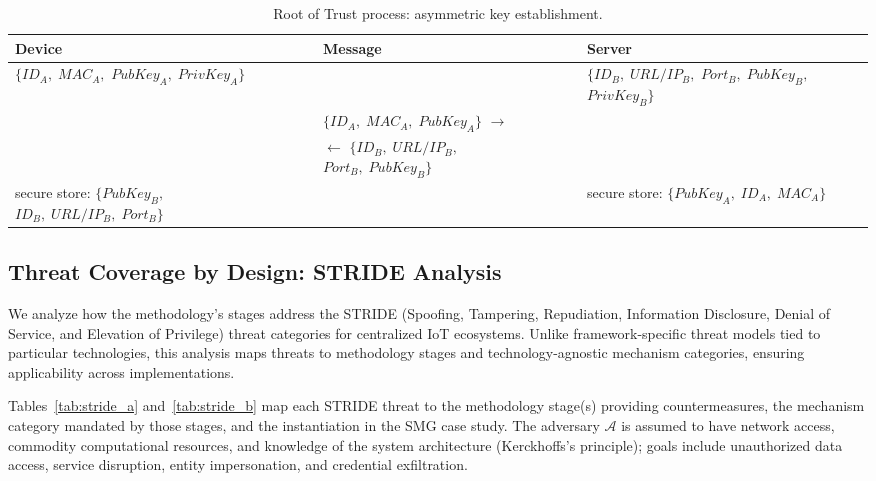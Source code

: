\documentclass[preprint,12pt,authoryear]{elsarticle}
\begin{document}
\begin{table}[htbp]
    \centering
    \caption{Root of Trust process: asymmetric key establishment.}
    \label{tab:rotpasym}
    \small
    \begin{tabular}{
        >{\centering\arraybackslash}p{3.8cm}
        c
        >{\centering\arraybackslash}p{4.0cm}
        c
        >{\centering\arraybackslash}p{3.8cm}
    }
        \toprule
        \textbf{Device} & & \textbf{Message} & & \textbf{Server} \\
        \midrule
        $\{ID_A,\;MAC_A,$ $PubKey_A,\;PrivKey_A\}$ & & & & $\{ID_B,\;URL/IP_B,$ $Port_B,\;PubKey_B,$ $PrivKey_B\}$ \\
        & & $\{ID_A,\;MAC_A,\;PubKey_A\}$ ${\rightarrow}$ & & \\
        & & ${\leftarrow}$ $\{ID_B,\;URL/IP_B,$ $Port_B,\;PubKey_B\}$ & & \\
        secure store: $\{PubKey_B,$ $ID_B,\;URL/IP_B,\;Port_B\}$ & & & & secure store: $\{PubKey_A,\;ID_A,\;MAC_A\}$ \\
        \bottomrule
    \end{tabular}
\end{table}

\subsection{Threat Coverage by Design: STRIDE Analysis}
\label{subsec:stride}

We analyze how the methodology's stages address the STRIDE (Spoofing, Tampering, Repudiation, Information Disclosure, Denial of Service, and Elevation of Privilege) threat categories \citep{shostack2014threat} for centralized IoT ecosystems. Unlike framework-specific threat models tied to particular technologies, this analysis maps threats to methodology stages and technology-agnostic mechanism categories, ensuring applicability across implementations.

Tables~\ref{tab:stride_a} and~\ref{tab:stride_b} map each STRIDE threat to the methodology stage(s) providing countermeasures, the mechanism category mandated by those stages, and the instantiation in the SMG case study. The adversary $\mathcal{A}$ is assumed to have network access, commodity computational resources, and knowledge of the system architecture (Kerckhoffs's principle); goals include unauthorized data access, service disruption, entity impersonation, and credential exfiltration.
\end{document}
